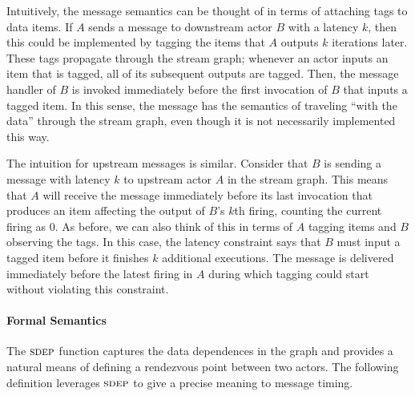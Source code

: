 \documentclass{sig-alternate}
\begin{document}
Intuitively, the message semantics can be thought of in terms of
attaching tags to data items.  If $A$ sends a message to downstream
actor $B$ with a latency $k$, then this could be implemented by
tagging the items that $A$ outputs $k$ iterations later.  These tags
propagate through the stream graph; whenever an actor inputs an item
that is tagged, all of its subsequent outputs are tagged.  Then, the
message handler of $B$ is invoked immediately before the first
invocation of $B$ that inputs a tagged item.  In this sense, the
message has the semantics of traveling ``with the data'' through the
stream graph, even though it is not necessarily implemented this way.

The intuition for upstream messages is similar.  Consider that $B$ is
sending a message with latency $k$ to upstream actor $A$ in the stream
graph.  This means that $A$ will receive the message immediately
before its last invocation that produces an item affecting the output
of $B$'s $k$th firing, counting the current firing as 0.  As before,
we can also think of this in terms of $A$ tagging items and $B$
observing the tags.  In this case, the latency constraint says that
$B$ must input a tagged item before it finishes $k$ additional
executions.  The message is delivered immediately before the latest
firing in $A$ during which tagging could start without violating this
constraint.

\paragraph*{Formal Semantics} The $\textsc{sdep}$ function captures the
data dependences in the graph and provides a natural means of defining
a rendezvous point between two actors.  The following definition
leverages $\textsc{sdep}$ to give a precise meaning to message timing.
\end{document}
